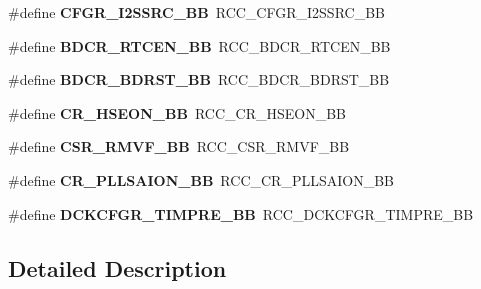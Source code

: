 \begin{DoxyCompactItemize}
\item 
\#define {\bfseries C\+F\+G\+R\+\_\+\+I2\+S\+S\+R\+C\+\_\+\+BB}~R\+C\+C\+\_\+\+C\+F\+G\+R\+\_\+\+I2\+S\+S\+R\+C\+\_\+\+BB\hypertarget{group___h_a_l___r_c_c___aliased_ga9076f5ddbb262fd45584702f5d280c9e}{}\label{group___h_a_l___r_c_c___aliased_ga9076f5ddbb262fd45584702f5d280c9e}

\item 
\#define {\bfseries B\+D\+C\+R\+\_\+\+R\+T\+C\+E\+N\+\_\+\+BB}~R\+C\+C\+\_\+\+B\+D\+C\+R\+\_\+\+R\+T\+C\+E\+N\+\_\+\+BB\hypertarget{group___h_a_l___r_c_c___aliased_gaf70aaf70b0752ccb3a60307b2fb46038}{}\label{group___h_a_l___r_c_c___aliased_gaf70aaf70b0752ccb3a60307b2fb46038}

\item 
\#define {\bfseries B\+D\+C\+R\+\_\+\+B\+D\+R\+S\+T\+\_\+\+BB}~R\+C\+C\+\_\+\+B\+D\+C\+R\+\_\+\+B\+D\+R\+S\+T\+\_\+\+BB\hypertarget{group___h_a_l___r_c_c___aliased_ga892fdf297b85b85cbaf0723649b31818}{}\label{group___h_a_l___r_c_c___aliased_ga892fdf297b85b85cbaf0723649b31818}

\item 
\#define {\bfseries C\+R\+\_\+\+H\+S\+E\+O\+N\+\_\+\+BB}~R\+C\+C\+\_\+\+C\+R\+\_\+\+H\+S\+E\+O\+N\+\_\+\+BB\hypertarget{group___h_a_l___r_c_c___aliased_ga08230c355dd58b92f14444c65521e248}{}\label{group___h_a_l___r_c_c___aliased_ga08230c355dd58b92f14444c65521e248}

\item 
\#define {\bfseries C\+S\+R\+\_\+\+R\+M\+V\+F\+\_\+\+BB}~R\+C\+C\+\_\+\+C\+S\+R\+\_\+\+R\+M\+V\+F\+\_\+\+BB\hypertarget{group___h_a_l___r_c_c___aliased_ga69d10c519fec30b0177c26dbf7d44e02}{}\label{group___h_a_l___r_c_c___aliased_ga69d10c519fec30b0177c26dbf7d44e02}

\item 
\#define {\bfseries C\+R\+\_\+\+P\+L\+L\+S\+A\+I\+O\+N\+\_\+\+BB}~R\+C\+C\+\_\+\+C\+R\+\_\+\+P\+L\+L\+S\+A\+I\+O\+N\+\_\+\+BB\hypertarget{group___h_a_l___r_c_c___aliased_gab84e7d3874237ee56e5cb3a26644cd13}{}\label{group___h_a_l___r_c_c___aliased_gab84e7d3874237ee56e5cb3a26644cd13}

\item 
\#define {\bfseries D\+C\+K\+C\+F\+G\+R\+\_\+\+T\+I\+M\+P\+R\+E\+\_\+\+BB}~R\+C\+C\+\_\+\+D\+C\+K\+C\+F\+G\+R\+\_\+\+T\+I\+M\+P\+R\+E\+\_\+\+BB\hypertarget{group___h_a_l___r_c_c___aliased_gaff212f4f5168f26347acf1abbb331961}{}\label{group___h_a_l___r_c_c___aliased_gaff212f4f5168f26347acf1abbb331961}

\end{DoxyCompactItemize}


\subsection{Detailed Description}
